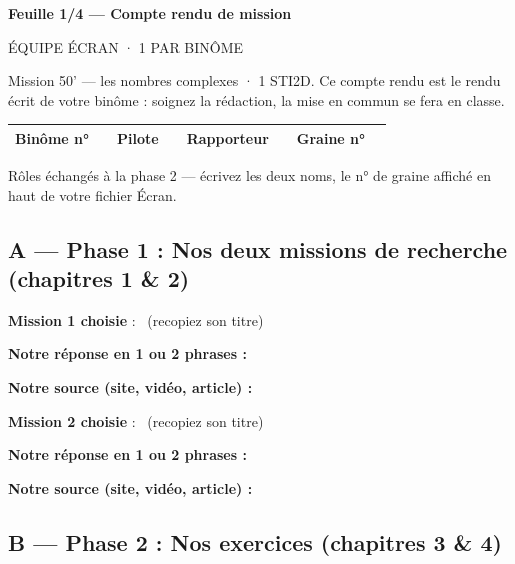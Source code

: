 \documentclass[11pt,a4paper]{article}
\renewcommand{\arraystretch}{1.4}
\newcommand{\pointilles}{\makebox[3.5cm]{\dotfill}}
\newcommand{\feuille}[3]{%
\begin{center}
  {\bfseries\large Feuille #1 --- #2}\\[2pt]
  {\small\colorbox{gray!15}{\parbox{0.5\textwidth}{\centering #3}}}
\end{center}}
\begin{document}
\feuille{1/4}{Compte rendu de mission}{ÉQUIPE ÉCRAN · 1 PAR BINÔME}

Mission 50' --- les nombres complexes · 1 STI2D. Ce compte rendu est le
rendu écrit de votre binôme : soignez la rédaction, la mise en commun se fera
en classe.

\begin{center}
\renewcommand{\arraystretch}{2}
\begin{tabularx}{\textwidth}{|l|X|l|X|l|X|l|X|}
  \hline
  \textbf{Binôme n°} & & \textbf{Pilote} & & \textbf{Rapporteur} & &
  \textbf{Graine n°} & \\ \hline
\end{tabularx}
\end{center}

Rôles échangés à la phase 2 --- écrivez les deux noms, le n° de graine affiché
en haut de votre fichier Écran.

\subsection*{A --- Phase 1 : Nos deux missions de recherche (chapitres 1 \& 2)}

\textbf{Mission 1 choisie} : \pointilles\ (recopiez son titre)

\textbf{Notre réponse en 1 ou 2 phrases :}

\pointilles\par\pointilles

\textbf{Notre source (site, vidéo, article) :}

\pointilles

\vspace{6pt}

\textbf{Mission 2 choisie} : \pointilles\ (recopiez son titre)

\textbf{Notre réponse en 1 ou 2 phrases :}

\pointilles\par\pointilles

\textbf{Notre source (site, vidéo, article) :}

\pointilles

\subsection*{B --- Phase 2 : Nos exercices (chapitres 3 \& 4)}
\end{document}
